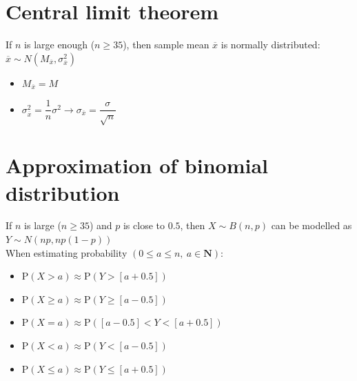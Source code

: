 \documentclass[oneside,fleqn,11pt]{book}
\begin{document}
	
	\section{Central limit theorem}
	If $n$ is large enough ($n\geq35$), then sample mean $\overline{x}$ is normally distributed: $\overline{x} \sim N(M_{\overline{x}}, \sigma_{\overline{x}}^2)$
	\begin{itemize}
		\item $M_{\overline{x}}=M$
		\item $\sigma_{\overline{x}}^2=\dfrac{1}{n}\sigma^2 \rightarrow \sigma_{\overline{x}} = \dfrac{\sigma}{\sqrt{n}}$
	\end{itemize}
	
	\section{Approximation of binomial distribution}
	If $n$ is large ($n\geq35$) and $p$ is close to $0.5$, then $X \sim B(n,p)$ can be modelled as $Y \sim N(np, np(1-p))$\\
	When estimating probability $(0\leq a \leq n, \: a \in \textbf{N})$:
	\begin{itemize}
		\item $\text{P}(X>a)\approx \text{P}(Y>[a+0.5])$
		\item $\text{P}(X\geq a)\approx \text{P}(Y\geq [a-0.5])$
		\item $\text{P}(X=a)\approx \text{P}([a-0.5]<Y<[a+0.5])$
		\item $\text{P}(X<a)\approx \text{P}(Y<[a-0.5])$
		\item $\text{P}(X \leq a)\approx \text{P}(Y\leq [a+0.5])$
	\end{itemize}
	

	
\end{document}
